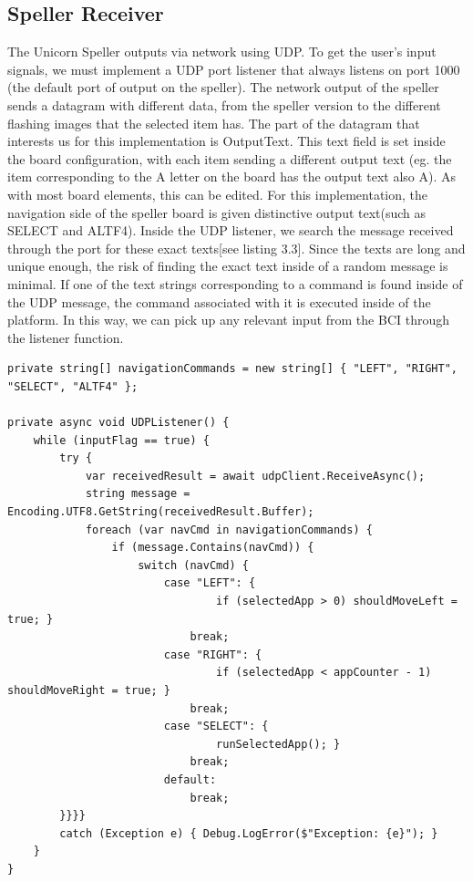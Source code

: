 \subsection{Speller Receiver}
The Unicorn Speller outputs via network using UDP. To get the user's input signals, we must implement a UDP port listener that always listens on port 1000 (the default port of output on the speller). The network output of the speller sends a datagram with different data, from the speller version to the different flashing images that the selected item has. The part of the datagram that interests us for this implementation is OutputText. This text field is set inside the board configuration, with each item sending a different output text (eg. the item corresponding to the A letter on the board has the output text also A). As with most board elements, this can be edited. For this implementation, the navigation side of the speller board is given distinctive output text(such as SELECT and ALTF4). Inside the UDP listener, we search the message received through the port for these exact texts[see listing 3.3]. Since the texts are long and unique enough, the risk of finding the exact text inside of a random message is minimal. If one of the text strings corresponding to a command is found inside of the UDP message, the command associated with it is executed inside of the platform. In this way, we can pick up any relevant input from the BCI through the listener function.
\begin{lstlisting}[language={[Sharp]C}, caption={Manager.cs initialisation}, label={Script}]
private string[] navigationCommands = new string[] { "LEFT", "RIGHT", "SELECT", "ALTF4" };

private async void UDPListener() {
    while (inputFlag == true) {
        try {
            var receivedResult = await udpClient.ReceiveAsync();
            string message = Encoding.UTF8.GetString(receivedResult.Buffer);
            foreach (var navCmd in navigationCommands) {
                if (message.Contains(navCmd)) {
                    switch (navCmd) {
                        case "LEFT": {
                                if (selectedApp > 0) shouldMoveLeft = true; }
                            break;
                        case "RIGHT": {
                                if (selectedApp < appCounter - 1) shouldMoveRight = true; }
                            break;
                        case "SELECT": {
                                runSelectedApp(); }
                            break;
                        default:
                            break;
        }}}}
        catch (Exception e) { Debug.LogError($"Exception: {e}"); }
    }
}
\end{lstlisting}


